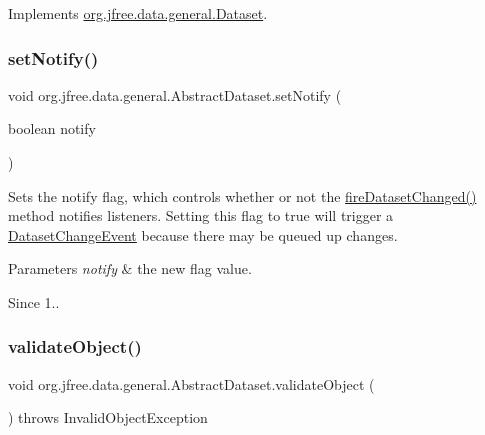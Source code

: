 Implements \mbox{\hyperlink{interfaceorg_1_1jfree_1_1data_1_1general_1_1_dataset_a48843f06c21e29847a62db0107b40138}{org.\+jfree.\+data.\+general.\+Dataset}}.

\mbox{\label{classorg_1_1jfree_1_1data_1_1general_1_1_abstract_dataset_ac5e2c21ab014ad147f71fd914e81fbb8}} 
\subsubsection{\texorpdfstring{set\+Notify()}{setNotify()}}
{\footnotesize\ttfamily void org.\+jfree.\+data.\+general.\+Abstract\+Dataset.\+set\+Notify (\begin{DoxyParamCaption}\item[{boolean}]{notify }\end{DoxyParamCaption})}

Sets the notify flag, which controls whether or not the \mbox{\hyperlink{classorg_1_1jfree_1_1data_1_1general_1_1_abstract_dataset_a95eadb1f154c4b4310bd04792617e633}{fire\+Dataset\+Changed()}} method notifies listeners. Setting this flag to {\ttfamily true} will trigger a {\ttfamily \mbox{\hyperlink{classorg_1_1jfree_1_1data_1_1general_1_1_dataset_change_event}{Dataset\+Change\+Event}}} because there may be queued up changes.


\begin{DoxyParams}{Parameters}
{\em notify} & the new flag value.\\
\hline
\end{DoxyParams}
\begin{DoxySince}{Since}
1.. 
\end{DoxySince}
\mbox{\label{classorg_1_1jfree_1_1data_1_1general_1_1_abstract_dataset_a7bd856ae173fdeedeb65c8f9cb461e52}} 
\subsubsection{\texorpdfstring{validate\+Object()}{validateObject()}}
{\footnotesize\ttfamily void org.\+jfree.\+data.\+general.\+Abstract\+Dataset.\+validate\+Object (\begin{DoxyParamCaption}{ }\end{DoxyParamCaption}) throws Invalid\+Object\+Exception}

